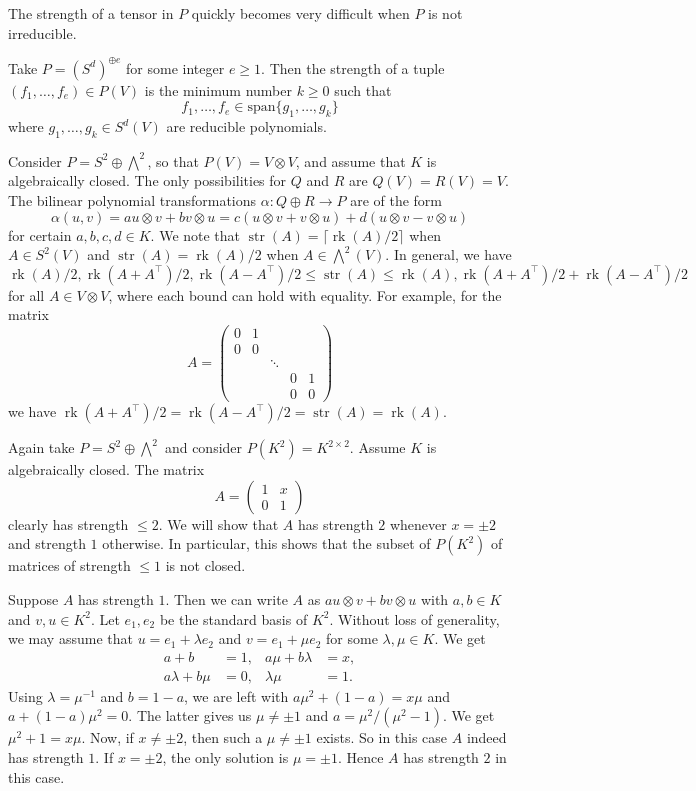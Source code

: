 \documentclass{amsart}
\theoremstyle{plain}
\theoremstyle{definition}
\DeclareMathOperator{\str}{str}
\DeclareMathOperator{\rk}{rk}
\newcommand{\Wedge}{\bigwedge\nolimits}
\begin{document}
The strength of a tensor in $P$ quickly becomes very difficult when $P$ is not irreducible.

\begin{ex}
Take $P=(S^d)^{\oplus e}$ for some integer $e\geq 1$. Then the strength of a tuple $(f_1,\ldots,f_e)\in P(V)$ is the minimum number $k\geq0$ such that
\[
f_1,\ldots,f_e\in\mathrm{span}\{g_1,\ldots,g_k\}
\]
where $g_1,\ldots,g_k\in S^d(V)$ are reducible polynomials.
\end{ex}

\begin{ex}
Consider $P=S^2\oplus\Wedge^2$, so that $P(V)=V \otimes V$,
and assume that $K$ is algebraically closed. The only possibilities for $Q$ and $R$ are
$Q(V)=R(V)=V$. The bilinear polynomial transformations $\alpha:Q \oplus R \to P$ are of the form
\[
\alpha(u,v)=a u \otimes v + b v \otimes u=c(u\otimes v+v\otimes u)+d(u\otimes v-v\otimes u)
\]
for certain $a,b,c,d \in K$. We note that $\str(A)=\lceil\rk(A)/2\rceil$ when $A\in S^2(V)$ and $\str(A)=\rk(A)/2$ when $A\in \Wedge^2(V)$. In general, we have
\[
\rk(A)/2,\rk(A+A^\top)/2,\rk(A-A^\top)/2\leq \str(A)\leq \rk(A),\rk(A+A^\top)/2+\rk(A-A^\top)/2
\]
for all $A\in V\otimes V$, where each bound can hold with equality. For example, for the matrix
\[
A=\begin{pmatrix}
0&1\\0&0\\&&\ddots\\&&&0&1\\&&&0&0
\end{pmatrix}
\]
we have $\rk(A+A^\top)/2=\rk(A-A^\top)/2=\str(A)=\rk(A)$.
\end{ex}

\begin{ex}
Again take $P=S^2\oplus\Wedge^2$ and consider $P(K^2)=K^{2\times 2}$. Assume $K$ is algebraically closed. The matrix
\[
A =\begin{pmatrix}1&x\\0&1\end{pmatrix}
\]
clearly has strength $\leq 2$. We will show that $A$ has strength $2$ whenever $x = \pm 2$ and strength $1$ otherwise. In particular, this shows that the subset of $P(K^2)$ of matrices of strength $\leq1$ is not closed.

Suppose $A$ has strength $1$. Then we can write $A$ as $a u \otimes v + b v \otimes u$ with $a, b \in K$ and $v, u \in K^2$. Let $e_1, e_2$ be the standard basis of $K^2$. Without loss of generality, we may assume that $u = e_1 + \lambda e_2$ and $v = e_1 + \mu e_2$ for some $\lambda,\mu\in K$. We get
\begin{align*}
a+b&=1,&a\mu+b\lambda&=x,\\
a\lambda+b\mu&=0,&\lambda\mu&=1.
\end{align*}
Using $\lambda=\mu^{-1}$ and $b = 1-a$, we are left with $a\mu^2 + (1-a) = x\mu$ and $a + (1-a)\mu^2 = 0$. The latter gives us $\mu\neq\pm1$ and $a = \mu^2/(\mu^2-1)$. We get $\mu^2 + 1=x\mu$. Now, if $x\neq\pm2$, then such a $\mu\neq\pm1$ exists. So in this case $A$ indeed has strength $1$. If $x = \pm 2$, the only solution is $\mu = \pm 1$. Hence $A$ has strength $2$ in this case.
\end{ex}
\end{document}
